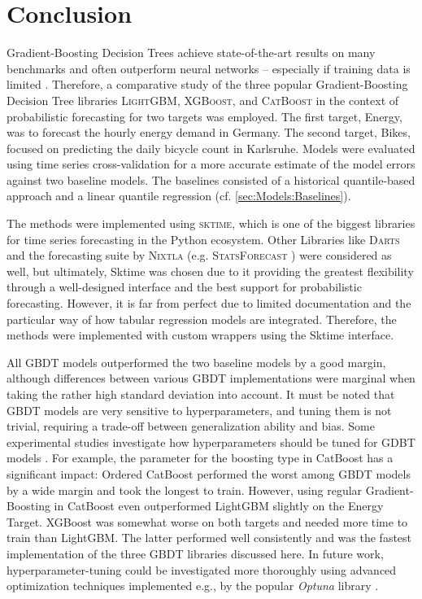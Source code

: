 \newpage
\section{Conclusion}
\label{ch:Conclusion}

Gradient-Boosting Decision Trees achieve state-of-the-art results on many benchmarks and often outperform neural networks -- especially if training data is limited \parencites{shwartz-ziv_tabular_2021, grinsztajn_why_2022}. Therefore, a comparative study of the three popular Gradient-Boosting Decision Tree libraries \textsc{LightGBM}, \textsc{XGBoost}, and \textsc{CatBoost} in the context of probabilistic forecasting for two targets was employed. The first target, Energy, was to forecast the hourly energy demand in Germany. The second target, Bikes, focused on predicting the daily bicycle count in Karlsruhe. Models were evaluated using time series cross-validation for a more accurate estimate of the model errors against two baseline models. The baselines consisted of a historical quantile-based approach and a linear quantile regression (cf. \cref{sec:Models:Baselines}).

The methods were implemented using \textsc{sktime}, which is one of the biggest libraries for time series forecasting in the Python ecosystem. Other Libraries like \textsc{Darts} \parencite{herzen_darts_2022} and the forecasting suite by \textsc{Nixtla} (e.g. \textsc{StatsForecast} \parencite{azul_garza_statsforecast_2022}) were considered as well, but ultimately, Sktime was chosen due to it providing the greatest flexibility through a well-designed interface and the best support for probabilistic forecasting. However, it is far from perfect due to limited documentation and the particular way of how tabular regression models are integrated. Therefore, the methods were implemented with custom wrappers using the Sktime interface.

All GBDT models outperformed the two baseline models by a good margin, although differences between various GBDT implementations were marginal when taking the rather high standard deviation into account. It must be noted that GBDT models are very sensitive to hyperparameters, and tuning them is not trivial, requiring a trade-off between generalization ability and bias. Some experimental studies investigate how hyperparameters should be tuned for GDBT models \parencites{florek_benchmarking_2023, bentejac_comparative_2021}. For example, the parameter for the boosting type in CatBoost has a significant impact: Ordered CatBoost performed the worst among GBDT models by a wide margin and took the longest to train. However, using regular Gradient-Boosting in CatBoost even outperformed LightGBM slightly on the Energy Target. XGBoost was somewhat worse on both targets and needed more time to train than LightGBM. The latter performed well consistently and was the fastest implementation of the three GBDT libraries discussed here. In future work, hyperparameter-tuning could be investigated more thoroughly using advanced optimization techniques implemented e.g., by the popular \textit{Optuna} library \parencite{akiba_optuna_2019}.

